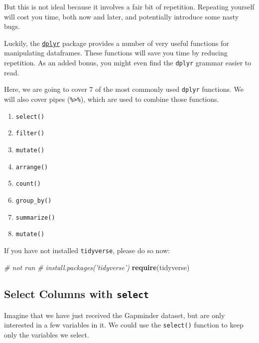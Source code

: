 \documentclass[
]{book}
\newenvironment{Shaded}{\begin{snugshade}}{\end{snugshade}}
\newcommand{\CommentTok}[1]{\textcolor[rgb]{0.56,0.35,0.01}{\textit{#1}}}
\newcommand{\KeywordTok}[1]{\textcolor[rgb]{0.13,0.29,0.53}{\textbf{#1}}}
\newcommand{\NormalTok}[1]{#1}
\providecommand{\tightlist}{%
  \setlength{\itemsep}{0pt}\setlength{\parskip}{0pt}}
\begin{document}
But this is not ideal because it involves a fair bit of repetition. Repeating yourself will cost you time, both now and later, and potentially introduce some nasty bugs.

Luckily, the \href{https://cran.r-project.org/web/packages/dplyr/dplyr.pdf}{\texttt{dplyr}} package provides a number of very useful functions for manipulating dataframes. These functions will save you time by reducing repetition. As an added bonus, you might even find the \texttt{dplyr} grammar easier to read.

Here, we are going to cover 7 of the most commonly used \texttt{dplyr} functions. We will also cover pipes (\texttt{\%\textgreater{}\%}), which are used to combine those functions.

\begin{enumerate}
\def\labelenumi{\arabic{enumi}.}
\tightlist
\item
  \texttt{select()}
\item
  \texttt{filter()}
\item
  \texttt{mutate()}
\item
  \texttt{arrange()}
\item
  \texttt{count()}
\item
  \texttt{group\_by()}
\item
  \texttt{summarize()}
\item
  \texttt{mutate()}
\end{enumerate}

If you have not installed \texttt{tidyverse}, please do so now:

\begin{Shaded}
\begin{Highlighting}[]
\CommentTok{# not run}
\CommentTok{# install.packages('tidyverse')}
\KeywordTok{require}\NormalTok{(tidyverse)}
\end{Highlighting}
\end{Shaded}

\hypertarget{select-columns-with-select}{%
\subsection{\texorpdfstring{Select Columns with \texttt{select}}{Select Columns with select}}\label{select-columns-with-select}}

Imagine that we have just received the Gapminder dataset, but are only interested in a few variables in it. We could use the \texttt{select()} function to keep only the variables we select.
\end{document}
